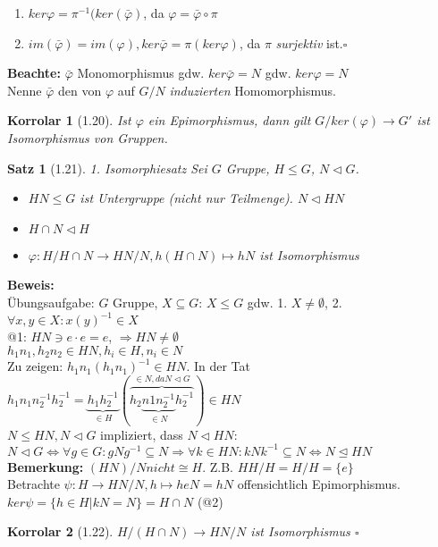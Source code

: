 \documentclass[10pt,a4paper]{article}
\newtheorem{satz}{Satz}
\newtheorem{korr}{Korrolar}
\begin{document}
\begin{enumerate}
 \item $ker \varphi = \pi^{-1}(ker(\bar{\varphi})$, da $\varphi = \bar{\varphi} \circ \pi$
 \item $im(\bar{\varphi}) = im(\varphi), ker \bar{\varphi} = \pi(ker \varphi)$, da $\pi$ \emph{surjektiv} ist.$\square$
\end{enumerate}
\textbf{Beachte:} $\bar{\varphi}$ Monomorphismus gdw. $ker \bar{\varphi} = N$ gdw. $ker{\varphi} = N$\\
Nenne $\bar{\varphi}$ den von $\varphi$ auf $G/N$ \emph{induzierten} Homomorphismus.\\
\begin{korr}[1.20]
Ist $\varphi$ ein Epimorphismus, dann gilt $G/ker(\varphi) \rightarrow G'$ ist Isomorphismus von Gruppen.
\end{korr}
\begin{satz}[1.21]{1. Isomorphiesatz}
Sei $G$ Gruppe, $H \leq G$, $N \lhd G$.
\begin{itemize}
 \item $HN \leq G$ ist Untergruppe (nicht nur Teilmenge). $N \lhd HN$
 \item $H \cap N \lhd H$
 \item $\varphi : {H}/{H \cap N} \rightarrow {HN}/{N}, h(H \cap N) \mapsto h N$ ist Isomorphismus
\end{itemize}
\end{satz}
\textbf{Beweis:}\\
Übungsaufgabe: $G$ Gruppe, $X \subseteq G$: $X \leq G$ gdw. 1. $X \neq \emptyset$, 2. $\forall x,y \in X : x (y)^{-1} \in X$\\
\smallskip
@1: $HN \ni e \cdot e = e$, $\Rightarrow HN \neq \emptyset$\\
$h_1 n_1, h_2 n_2 \in HN, h_i \in H, n_i \in N$ \\
Zu zeigen: $h_1 n_1 (h_1 n_1)^{-1} \in HN$. In der Tat $h_1 n_1 n_2^{-1} h_2^{-1} = \underbrace{h_1 h_2^{-1}}_{\in H} (\overbrace{h_2 \underbrace{n1 n_2^{-1}}_{\in N} h_2^{-1}}^{\in N, da N \lhd G}) \in HN$\\
$N \leq HN, N \lhd G$ impliziert, dass $N \lhd HN$:\\
$N \lhd G \Leftrightarrow \forall g \in G : g N g^{-1} \subseteq N \Rightarrow \forall k \in HN : kN k^{-1} \subseteq N \Leftrightarrow N \unlhd HN$\\
\textbf{Bemerkung:} $(HN)/N nicht \cong H$. Z.B. $HH/H = H/H = \lbrace e \rbrace$\\
Betrachte $\psi: H \rightarrow {HN}/{N}, h \mapsto h e N = hN$ offensichtlich Epimorphismus.\\
$ker \psi = \lbrace h \in H | kN = N \rbrace = H \cap N$ (@2)
\begin{korr}[1.22]
$H/(H\cap N) \rightarrow HN/N$ ist Isomorphismus $\square$
\end{korr}
\end{document}
